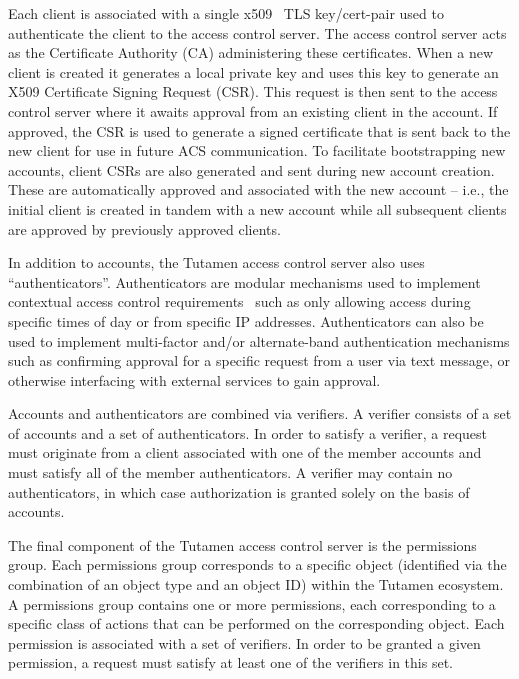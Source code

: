 Each client is associated with a single x509~\cite{rfc5280} TLS
key/cert-pair used to authenticate the client to the access control
server. The access control server acts as the Certificate Authority
(CA) administering these certificates. When a new client is created it
generates a local private key and uses this key to generate an X509
Certificate Signing Request (CSR). This request is then sent to the
access control server where it awaits approval from an existing client
in the account. If approved, the CSR is used to generate a signed
certificate that is sent back to the new client for use in future ACS
communication. To facilitate bootstrapping new accounts, client CSRs
are also generated and sent during new account creation. These are
automatically approved and associated with the new account -- i.e.,
the initial client is created in tandem with a new account while all
subsequent clients are approved by previously approved clients.

In addition to accounts, the Tutamen access control server also uses
``authenticators''. Authenticators are modular mechanisms used to
implement contextual access control requirements~\cite{hulsebosch2005}
such as only allowing access during specific times of day or from
specific IP addresses. Authenticators can also be used to implement
multi-factor and/or alternate-band authentication mechanisms such as
confirming approval for a specific request from a user via text
message, or otherwise interfacing with external services to gain
approval.

Accounts and authenticators are combined via verifiers. A verifier
consists of a set of accounts and a set of authenticators. In order to
satisfy a verifier, a request must originate from a client associated
with one of the member accounts and must satisfy all of the member
authenticators. A verifier may contain no authenticators, in which
case authorization is granted solely on the basis of accounts.

The final component of the Tutamen access control server is the
permissions group. Each permissions group corresponds to a specific
object (identified via the combination of an object type and an object
ID) within the Tutamen ecosystem. A permissions group contains one or
more permissions, each corresponding to a specific class of actions
that can be performed on the corresponding object. Each permission is
associated with a set of verifiers. In order to be granted a given
permission, a request must satisfy at least one of the verifiers in
this set.


